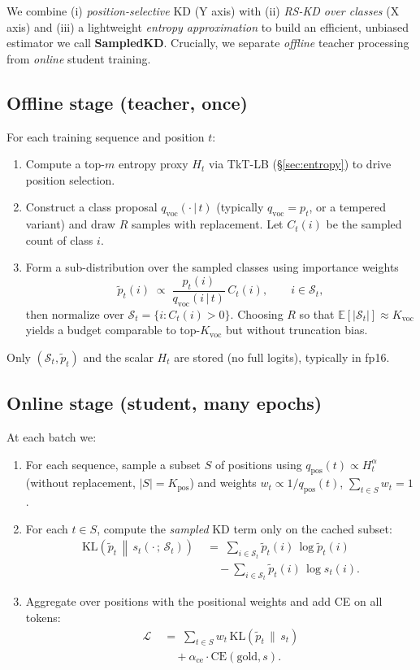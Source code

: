 \documentclass[11pt]{article}
\begin{document}
We combine (i) \emph{position-selective} KD (Y axis) with (ii) \emph{RS-KD over classes} (X axis) and (iii) a lightweight \emph{entropy approximation} to build an efficient, unbiased estimator we call \textbf{SampledKD}.
Crucially, we separate \emph{offline} teacher processing from \emph{online} student training.

\subsection{Offline stage (teacher, once)}
For each training sequence and position $t$:
\begin{enumerate}
	\item Compute a top-$m$ entropy proxy $H_t$ via TkT-LB (\S\ref{sec:entropy}) to drive position selection.
	\item Construct a class proposal $q_{\text{voc}}(\cdot\,|\,t)$ (typically $q_{\text{voc}}\!=\!p_t$, or a tempered variant) and draw $R$ samples with replacement. Let $C_t(i)$ be the sampled count of class $i$.
	\item Form a sub-distribution over the sampled classes using importance weights
	      \[
		      \tilde p_t(i) \;\propto\; \frac{p_t(i)}{q_{\text{voc}}(i\,|\,t)} \, C_t(i),
		      \qquad i \in \mathcal{S}_t,
	      \]
	      then normalize over $\mathcal{S}_t=\{i: C_t(i)>0\}$. Choosing $R$ so that $\mathbb{E}[|\mathcal{S}_t|]\!\approx\!K_{\text{voc}}$ yields a budget comparable to top-$K_{\text{voc}}$ but without truncation bias.
\end{enumerate}
Only $(\mathcal{S}_t, \tilde p_t)$ and the scalar $H_t$ are stored (no full logits), typically in fp16.

\subsection{Online stage (student, many epochs)}
At each batch we:
\begin{enumerate}
	\item For each sequence, sample a subset $S$ of positions using $q_{\text{pos}}(t)\!\propto\!H_t^\alpha$ (without replacement, $|S|{=}K_{\text{pos}}$) and weights $w_t \propto 1/q_{\text{pos}}(t)$, $\sum_{t\in S}w_t{=}1$.
	\item For each $t \in S$, compute the \emph{sampled} KD term only on the cached subset:
	      \begin{align*}
		      \mathrm{KL}\!\left(\tilde p_t \,\middle\|\, s_t(\cdot\,;\,\mathcal{S}_t)\right)
		      \; & =\; \sum_{i \in \mathcal{S}_t} \tilde p_t(i)\,\log \tilde p_t(i) \\
		         & \quad - \sum_{i \in \mathcal{S}_t} \tilde p_t(i)\,\log s_t(i).
	      \end{align*}
	\item Aggregate over positions with the positional weights and add CE on all tokens:
	      \begin{align*}
		      \mathcal{L} \; & =\; \sum_{t\in S} w_t\, \mathrm{KL}\!\left(\tilde p_t \,\|\, s_t\right) \\
		                     & \quad + \alpha_{\text{ce}} \cdot \text{CE}(\text{gold}, s).
	      \end{align*}
\end{enumerate}
\end{document}
